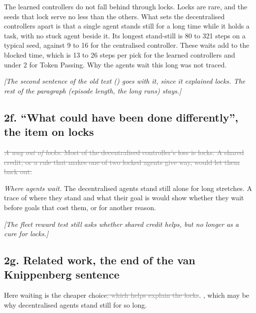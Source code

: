 \documentclass[11pt,a4paper]{article}
\newcommand{\new}[1]{\textcolor{newc}{#1}}
\newcommand{\old}[1]{\textcolor{gray}{\sout{#1}}}
\newcommand{\note}[1]{{\small\itshape [#1]}}
\newcommand{\lab}[1]{\textsf{\footnotesize\detokenize{#1}}}
\newcommand{\citet}[1]{\lab{#1}}
\begin{document}
\new{The learned controllers do not fall behind through locks. Locks are rare,
and the seeds that lock serve no less than the others. What sets the
decentralised controllers apart is that a single agent stands still for a
long time while it holds a task, with no stuck agent beside it. Its longest
stand-still is 80 to 321 steps on a typical seed, against 9 to 16 for the
centralised controller. These waits add to the blocked time, which is 13 to
26 steps per pick for the learned controllers and under 2 for Token Passing.
Why the agents wait this long was not traced.}

\note{The second sentence of the old text (\citet{krnjaic2022warehouse_marl})
goes with it, since it explained locks. The rest of the paragraph (episode length, the long runs) stays.}

\subsection*{2f. ``What could have been done differently'', the item on locks}
\old{\emph{A way out of locks.} Most of the decentralised controller's loss is
locks. A shared credit, or a rule that makes one of two locked agents give
way, would let them back out.}

\new{\emph{Where agents wait.} The decentralised agents stand still alone for
long stretches. A trace of where they stand and what their goal is would show
whether they wait before goals that cost them, or for another reason.}

\note{The fleet reward test still asks whether shared credit helps, but no
longer as a cure for locks.}

\subsection*{2g. Related work, the end of the van Knippenberg sentence}
Here waiting is the cheaper choice\old{, which helps explain the locks}.
\new{, which may be why decentralised agents stand still for so long}.
\end{document}
